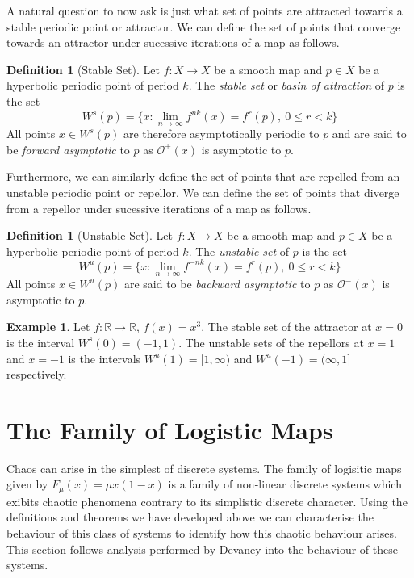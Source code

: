 \documentclass[11pt,a4paper,oneside]{memoir}
\theoremstyle{plain}
\theoremstyle{definition}
\newtheorem{defn}[thm]{Definition}
\newtheorem{exmp}[thm]{Example}
\begin{document}
A natural question to now ask is just what set of points are attracted towards a stable periodic point or attractor. We can define the set of points that converge towards an attractor under sucessive iterations of a map as follows.

\begin{defn}[Stable Set]
    Let $f: X \to X$ be a smooth map and $p \in X$ be a hyperbolic periodic point of period $k$. The \emph{stable set} or \emph{basin of attraction} of $p$ is the set \[W^s(p) = \lbrace x : \lim_{n \to \infty} f^{nk}(x) = f^r(p), \ 0 \leq r < k \rbrace\] All points $x \in W^s(p)$ are therefore asymptotically periodic to $p$ and are said to be \emph{forward asymptotic} to $p$ as $\mathcal{O}^+(x)$ is asymptotic to $p$.
\end{defn}

Furthermore, we can similarly define the set of points that are repelled from an unstable periodic point or repellor. We can define the set of points that diverge from a repellor under sucessive iterations of a map as follows.

\begin{defn}[Unstable Set]
    Let $f: X \to X$ be a smooth map and $p \in X$ be a hyperbolic periodic point of period $k$. The \emph{unstable set} of $p$ is the set \[W^u(p) = \lbrace x : \lim_{n \to \infty} f^{-nk}(x) = f^r(p), \ 0 \leq r < k \rbrace\] All points $x \in W^u(p)$ are said to be \emph{backward asymptotic} to $p$ as $\mathcal{O}^-(x)$ is asymptotic to $p$.
\end{defn}

\begin{exmp}
    Let $f: \mathbb{R} \to \mathbb{R}$, $f(x) = x^3$. The stable set of the attractor at $x = 0$ is the interval $W^s(0) = (-1, 1)$. The unstable sets of the repellors at $x = 1$ and $x = -1$ is the intervals $W^u(1) = [1, \infty)$ and $W^u(-1) = (\infty, 1]$ respectively.
\end{exmp}

\section{The Family of Logistic Maps}
Chaos can arise in the simplest of discrete systems. The family of logisitic maps given by $F_\mu(x) = \mu x(1-x)$ is a family of non-linear discrete systems which exibits chaotic phenomena contrary to its simplistic discrete character. Using the definitions and theorems we have developed above we can characterise the behaviour of this class of systems to identify how this chaotic behaviour arises. This section follows analysis performed by Devaney \cite{devaney} into the behaviour of these systems.
\end{document}
